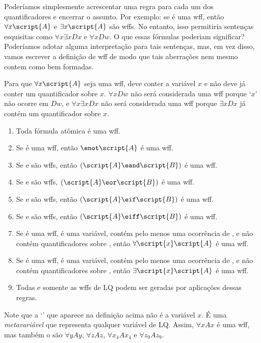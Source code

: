 Poderíamos simplesmente acrescentar uma regra para cada um dos quantificadores e encerrar o assunto. Por exemplo: se  é uma wff, então $\forall x\script{A}$ e $\exists x\script{A}$ são wffs. No entanto, isso permitiria sentenças esquisitas como $\forall x\exists x Dx$ e $\forall x Dw$. O que essas fórmulas poderiam significar? Poderíamos adotar alguma interpretação para tais sentenças, mas, em vez disso, vamos escrever a definição de wff de modo que tais aberrações nem mesmo contem como bem formadas.

Para que $\forall x\script{A}$ seja uma wff,  deve conter a variável $x$ e não deve já conter um quantificador sobre $x$. $\forall x Dw$ não será considerada uma wff porque `$x$' não ocorre em $Dw$, e $\forall x \exists x Dx$ não será considerada uma wff porque $\exists x Dx$ já contém um quantificador sobre $x$.

\begin{enumerate}
\item Toda fórmula atômica é uma wff.
\item Se  é uma wff, então $\enot\script{A}$ é uma wff.
\item Se  e  são wffs, então $(\script{A}\eand\script{B})$ é uma wff.
\item Se  e  são wffs, $(\script{A}\eor\script{B})$ é uma wff.
\item Se  e  são wffs, então $(\script{A}\eif\script{B})$ é uma wff.
\item Se  e  são wffs, então $(\script{A}\eiff\script{B})$ é uma wff.
\item Se  é uma wff,  é uma variável,  contém pelo menos uma ocorrência de , e  não contém quantificadores sobre , então $\forall\script{x}\script{A}$ é uma wff.
\item Se  é uma wff,  é uma variável,  contém pelo menos uma ocorrência de , e  não contém quantificadores sobre , então $\exists\script{x}\script{A}$ é uma wff.
\item Todas e somente as wffs de LQ podem ser geradas por aplicações dessas regras.
\end {enumerate}

Note que a `' que aparece na definição acima não é a variável $x$. É uma \emph{metavariável} que representa qualquer variável de LQ. Assim, $\forall xAx$ é uma wff, mas também o são $\forall yAy$, $\forall zAz$, $\forall x_4Ax_4$ e $\forall z_9Az_9$.

